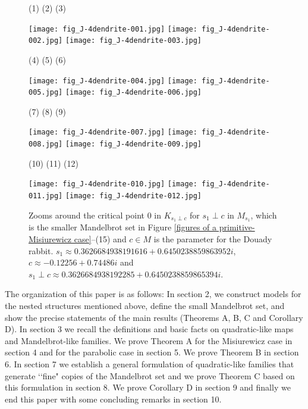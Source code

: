 \begin{figure}[htbp] \small
\hskip -40mm
(1)
\hskip 43mm
(2)
\hskip 43mm
(3)

\texttt{[image: fig\_J-4dendrite-001.jpg]} \hskip 5mm
\texttt{[image: fig\_J-4dendrite-002.jpg]} \hskip 5mm
\texttt{[image: fig\_J-4dendrite-003.jpg]} 


\hskip -40mm
(4)
\hskip 43mm
(5)
\hskip 43mm
(6)

\texttt{[image: fig\_J-4dendrite-004.jpg]} \hskip 5mm
\texttt{[image: fig\_J-4dendrite-005.jpg]} \hskip 5mm
\texttt{[image: fig\_J-4dendrite-006.jpg]}

\hskip -40mm
(7)
\hskip 43mm
(8)
\hskip 43mm
(9)

\texttt{[image: fig\_J-4dendrite-007.jpg]} \hskip 5mm
\texttt{[image: fig\_J-4dendrite-008.jpg]} \hskip 5mm
\texttt{[image: fig\_J-4dendrite-009.jpg]}

\hskip -38mm
(10)
\hskip 41mm
(11)
\hskip 41mm
(12)

\texttt{[image: fig\_J-4dendrite-010.jpg]} \hskip 5mm
\texttt{[image: fig\_J-4dendrite-011.jpg]} \hskip 5mm
\texttt{[image: fig\_J-4dendrite-012.jpg]} 
\caption{\small Zooms around the critical point $0$ in $K_{s_1 \perp c}$
for $s_1 \perp c$ in $M_{s_1}$, 
which is the smaller Mandelbrot set in 
Figure \ref{figures of a primitive-Misiurewicz case}--(15) and $c \in M$
is the parameter for the Douady rabbit. 
$s_1 \approx 0.3626684938191616+0.6450238859863952i$, 
$c \approx -0.12256+0.74486i$ and 
$s_1 \perp c \approx 0.3626684938192285 + 0.6450238859865394i$.
}
\label{nested structure for a filled Julia set}
\end{figure}






The organization of this paper is as follows: 
In section 2, we construct models for the nested structures mentioned 
above, define the small Mandelbrot set, and show the precise statements 
of the main results (Theorems A, B, C and Corollary D). In section 3 we
recall the definitions and basic facts on quadratic-like maps
and Mandelbrot-like families. We prove Theorem A for the Misiurewicz case in 
section 4 and for the parabolic case in section 5. We prove Theorem B in 
section 6.
In section 7 we establish a general formulation
of quadratic-like families that generate \lq\lq fine" copies of the Mandelbrot 
set and we prove Theorem C based on this formulation in section 8. We prove 
Corollary D in section 9
and finally we end this paper with some concluding remarks in section 10. 




